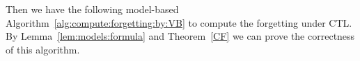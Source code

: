 \documentclass{article}
\begin{document}


Then we have the following model-based Algorithm~\ref{alg:compute:forgetting:by:VB} to compute the forgetting under CTL.
By Lemma~\ref{lem:models:formula} and Theorem~\ref{CF} we can prove the correctness of this algorithm.
\end{document}
